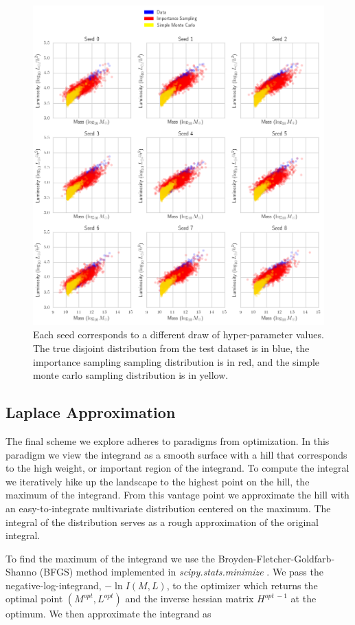 \documentclass[\docopts]{\docclass}
\begin{document}
\begin{figure}[h]
\centering
\includegraphics[width=0.9\columnwidth]{isworks.png}
\caption{
Each seed corresponds to a different draw of hyper-parameter values. The true disjoint distribution from the test dataset is in blue, the importance sampling sampling distribution is in red, and the simple monte carlo sampling distribution is in yellow.
\label{fig:isworks}}
\end{figure}

\subsection{Laplace Approximation}
\label{subsec:laplace}

The final scheme we explore adheres to paradigms from optimization. 
In this paradigm we view the integrand as a smooth surface with a hill that corresponds to the high weight, or important region of the integrand. 
To compute the integral we iteratively hike up the landscape to the highest point on the hill, the maximum of the integrand. 
From this vantage point we approximate the hill with an easy-to-integrate multivariate distribution centered on the maximum. 
The integral of the distribution serves as a rough approximation of the original integral.

To find the maximum of the integrand we use the Broyden-Fletcher-Goldfarb-Shanno (BFGS) method implemented in \emph{scipy.stats.minimize} \citep{scipy}. 
We pass the negative-log-integrand, $-\ln I(M,L)$, to the optimizer which returns the optimal point $(M^{opt}, L^{opt})$ and the inverse hessian matrix $H^{opt\ -1}$ at the optimum. 
We then approximate the integrand as 
\end{document}
